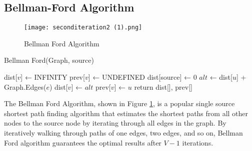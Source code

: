 \documentclass[12pt]{article}
\begin{document}
\subsection{Bellman-Ford Algorithm}
\begin{figure}[hbt!]
\begin{center}
  \texttt{[image: seconditeration2 (1).png]}
  \caption{Bellman Ford Algorithm \cite{rajboston1951}}
  \label{fig:bell}
  \end{center}
\end{figure}\begin{algorithm}
	\caption{Bellman Ford(Graph, source)} 
	\begin{algorithmic}[2]
		    \State dist[$v$] ← INFINITY
		    \State prev[$v$] ← UNDEFINED  
		\EndFor
		\State dist[source] ← 0
		        \State $alt$ ← dist[$u$] + Graph.Edges($e$)
                    \State dist[$v$] ← $alt$
                    \State prev[$v$] ← $u$
                \EndIf 
		    \EndFor
		\EndFor
	\State return dist[], prev[]
	\end{algorithmic} 
\end{algorithm}
The Bellman Ford Algorithm, shown in Figure \ref{fig:bell}, is a popular single source shortest path finding algorithm that estimates the shortest paths from all other nodes to the source node by iterating through all edges in the graph. By iteratively walking through paths of one edges, two edges, and so on, Bellman Ford algorithm guarantees the optimal results after $V-1$ iterations.
\end{document}
